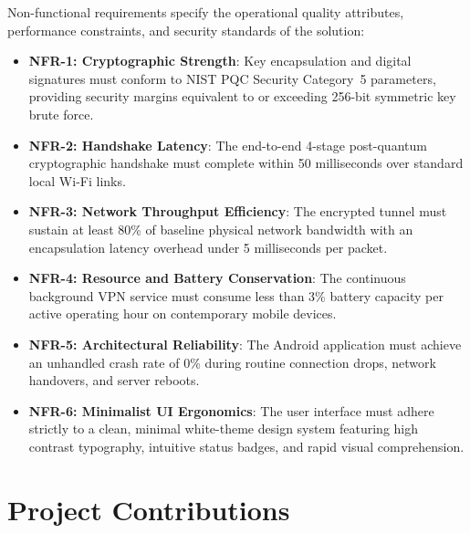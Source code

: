 Non-functional requirements specify the operational quality attributes, performance constraints, and security standards of the solution:
\begin{itemize}
    \item \textbf{NFR-1: Cryptographic Strength}: Key encapsulation and digital signatures must conform to NIST PQC Security Category~5 parameters, providing security margins equivalent to or exceeding 256-bit symmetric key brute force.
    \item \textbf{NFR-2: Handshake Latency}: The end-to-end 4-stage post-quantum cryptographic handshake must complete within 50 milliseconds over standard local Wi-Fi links.
    \item \textbf{NFR-3: Network Throughput Efficiency}: The encrypted tunnel must sustain at least 80\% of baseline physical network bandwidth with an encapsulation latency overhead under 5 milliseconds per packet.
    \item \textbf{NFR-4: Resource and Battery Conservation}: The continuous background VPN service must consume less than 3\% battery capacity per active operating hour on contemporary mobile devices.
    \item \textbf{NFR-5: Architectural Reliability}: The Android application must achieve an unhandled crash rate of 0\% during routine connection drops, network handovers, and server reboots.
    \item \textbf{NFR-6: Minimalist UI Ergonomics}: The user interface must adhere strictly to a clean, minimal white-theme design system featuring high contrast typography, intuitive status badges, and rapid visual comprehension.
\end{itemize}

\section{Project Contributions}
\label{sec:project_contributions}

